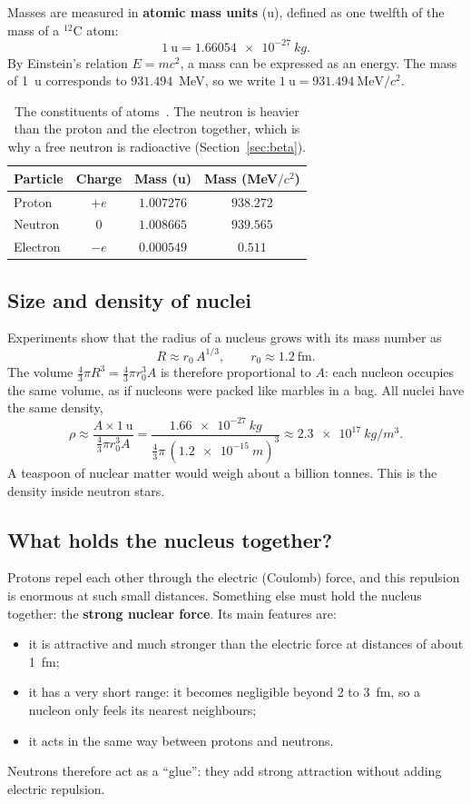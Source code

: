 \documentclass[11pt,a4paper]{article}
\newcommand{\iso}[2]{\ensuremath{{}^{#1}\mathrm{#2}}}         %
\begin{document}
Masses are measured in \textbf{atomic mass units} (u), defined as one twelfth of the mass of a \iso{12}{C} atom:
\[
1~\text{u} = \SI{1.66054e-27}{kg}.
\]
By Einstein's relation $E = mc^2$, a mass can be expressed as an energy. The mass of 1~u corresponds to $931.494$~MeV, so we write $1~\text{u} = 931.494~\text{MeV}/c^2$.

\begin{table}[h]
\centering
\begin{tabular}{lccc}
\toprule
Particle & Charge & Mass (u) & Mass (MeV$/c^2$) \\
\midrule
Proton   & $+e$ & $1.007276$ & $938.272$ \\
Neutron  & $0$  & $1.008665$ & $939.565$ \\
Electron & $-e$ & $0.000549$ & $0.511$ \\
\bottomrule
\end{tabular}
\caption{The constituents of atoms~\cite{CODATA2018}. The neutron is heavier than the proton and the electron together, which is why a free neutron is radioactive (Section~\ref{sec:beta}).}
\label{tab:particles}
\end{table}

\subsection{Size and density of nuclei}

Experiments show that the radius of a nucleus grows with its mass number as
\begin{equation}
  R \approx r_0\, A^{1/3}, \qquad r_0 \approx 1.2~\text{fm}.
  \label{eq:radius}
\end{equation}
The volume $\frac{4}{3}\pi R^3 = \frac{4}{3}\pi r_0^3 A$ is therefore proportional to $A$: each nucleon occupies the same volume, as if nucleons were packed like marbles in a bag. All nuclei have the same density,
\[
\rho \approx \frac{A \times 1~\text{u}}{\frac{4}{3}\pi r_0^3 A}
= \frac{\SI{1.66e-27}{kg}}{\frac{4}{3}\pi\,(\SI{1.2e-15}{m})^3} \approx \SI{2.3e17}{kg/m^3}.
\]
A teaspoon of nuclear matter would weigh about a billion tonnes. This is the density inside neutron stars.

\subsection{What holds the nucleus together?}

Protons repel each other through the electric (Coulomb) force, and this repulsion is enormous at such small distances. Something else must hold the nucleus together: the \textbf{strong nuclear force}. Its main features are:
\begin{itemize}
  \item it is attractive and much stronger than the electric force at distances of about 1~fm;
  \item it has a very short range: it becomes negligible beyond 2 to 3~fm, so a nucleon only feels its nearest neighbours;
  \item it acts in the same way between protons and neutrons.
\end{itemize}
Neutrons therefore act as a ``glue'': they add strong attraction without adding electric repulsion.
\end{document}
